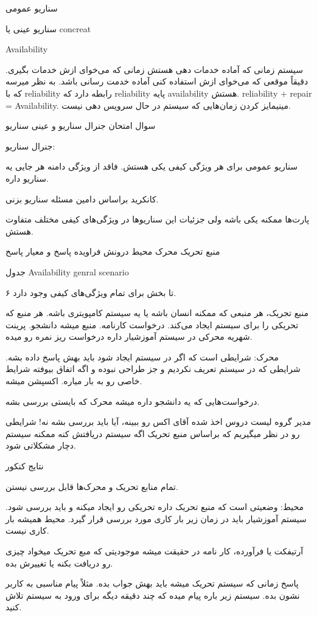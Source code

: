 سناریو عمومی

سناریو عینی یا concreat

Availability

سیستم زمانی که آماده خدمات دهی هستش زمانی که می‌خوای ازش خدمات بگیری. دقیقاً
موقعی که می‌خوای ازش استفاده کنی آماده خدمت رسانی باشد. به نظر میرسه که با
reliability رابطه دارد که reliability پایه availability هستش. reliability +
repair = Availability. مینیمایز کردن زمان‌هایی که سیستم در حال سرویس دهی نیست.

سوال امتحان جنرال سناریو و عینی سناریو

جنرال سناریو:

سناریو عمومی برای هر ویژگی کیفی یکی هستش. فاقد از ویژگی دامنه هر جایی یه سناریو داره.

کانکرید براساس دامین مسئله سناریو بزنی.

پارت‌ها ممکنه یکی باشه ولی جزئیات این سناریو‌ها در ویژگی‌های کیفی مختلف متفاوت هستش.

منبع تحریک
محرک 
محیط  درونش فراویده
پاسخ و معیار پاسخ

جدول Availability genral scenario

۶ تا بخش برای تمام ویژگی‌های کیفی وجود دارد.

منبع تجریک، هر منبعی که ممکنه انسان باشه یا یه سیستم کامپویتری باشه. هر منبع که
تحریکی را برای سیستم ایجاد می‌کند. درخواست کارنامه. منبع میشه دانشجو. پرینت
شهریه محرکی در سیستم آموزشیار داره درخواست ریز نمره رو میده.

محرک: شرایطی است که اگر در سیستم ایجاد شود باید بهش پاسخ داده بشه. شرایطی که در
سیستم تعریف نکردیم و جز طراحی نبوده و اگه اتفاق بیوفته شرایط خاصی رو به بار
میاره. اکسپشن میشه.

درخواست‌هایی که یه دانشجو داره میشه محرک که بایستی بررسی بشه.

مدیر گروه لیست دروس اخذ شده آقای اکس رو ببینه، آیا باید بررسی بشه نه! شرایطی رو
در نظر میگیریم که براساس منبع تحریک اگه سیستم دریافتش کنه ممکنه سیستم دچار
مشکلاتی شود.

نتایج کنکور

تمام منابع تحریک و محرک‌ها قابل بررسی نیستن.

محیط: وضعیتی است که منبع تحریک داره تحریکی رو ایجاد میکنه و باید بررسی شود.
سیستم آموزشیار باید در زمان زیر بار کاری مورد بررسی قرار گیرد. محیط همیشه بار
کاری نیست. 

آرتیفکت یا فرآورده، کار نامه در حقیقت میشه موجودیتی که مبع تحریک میخواد چیزی رو
دریافت بکنه یا تغییرش بده. 

پاسخ زمانی که سیستم تحریک میشه باید بهش جواب بده. مثلاً پیام مناسبی به کاربر
نشون بده. سیستم زیر باره پیام میده که چند دقیقه دیگه برای ورود به سیستم تلاش
کنید.

